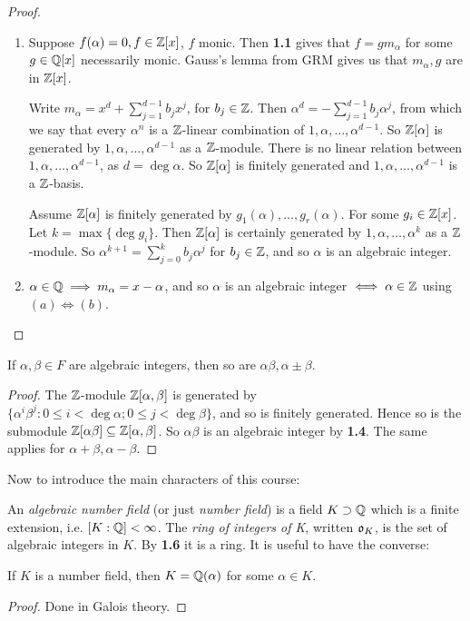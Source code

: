 \documentclass[10pt,a4paper]{article}
\begin{document}
\begin{proof}\item
\begin{enumerate}
\item
\begin{enumerate}
 Suppose $f(\alpha) = 0, f \in \mathbb{Z}[x]$, $f$ monic. Then \textbf{1.1} gives that $f = gm_{\alpha}$ for some $g \in \mathbb{Q}[x]$ necessarily monic. Gauss's lemma from GRM gives us that $m_{\alpha}, g$ are in $\mathbb{Z}[x]$.

 Write $m_{\alpha} = x^d + \sum_{j=1}^{d-1} b_j x^j$, for $b_j \in \mathbb{Z}$. Then $\alpha^d = -\sum_{j=1}^{d-1} b_j \alpha^j$, from which we say that every $\alpha^n$ is a $\mathbb{Z}$-linear combination of $1, \alpha, \ldots, \alpha^{d-1}$. So $\mathbb{Z}[\alpha]$ is generated by $1, \alpha, \ldots, \alpha^{d-1}$ as a $\mathbb{Z}$-module. There is no linear relation between $1, \alpha, \ldots, \alpha^{d-1}$, as $d = \deg \alpha$. So $\mathbb{Z}[\alpha]$ is finitely generated and $1, \alpha, \ldots, \alpha^{d-1}$ is a $\mathbb{Z}$-basis.

 Assume $\mathbb{Z}[\alpha]$ is finitely generated by $g_1(\alpha), \ldots, g_r(\alpha)$. For some $g_i \in \mathbb{Z}[x]$. Let $k = \max\{\deg g_i\}$. Then $\mathbb{Z}[\alpha]$ is certainly generated by $1, \alpha, \ldots, \alpha^k$ as a $\mathbb{Z}$-module. So $\alpha^{k+1} = \sum_{j=0}^k b_j \alpha^j$ for $b_j \in \mathbb{Z}$, and so $\alpha$ is an algebraic integer.
\end{enumerate}
\item $\alpha \in \mathbb{Q} \implies m_{\alpha} = x-\alpha$, and so $\alpha$ is an algebraic integer $\iff \alpha \in \mathbb{Z}$ using $(a) \iff (b)$.
\end{enumerate}
\end{proof}

\begin{theorem}
If $\alpha, \beta \in F$ are algebraic integers, then so are $\alpha\beta, \alpha\pm\beta$.
\end{theorem}
\begin{proof}
The $\mathbb{Z}$-module $\mathbb{Z}[\alpha,\beta]$ is generated by $\{\alpha^i\beta^j : 0 \leq i < \deg \alpha; 0 \leq j < \deg \beta\}$, and so is finitely generated. Hence so is the submodule $\mathbb{Z}[\alpha\beta]\subseteq \mathbb{Z}[\alpha,\beta]$. So $\alpha\beta$ is an algebraic integer by \textbf{1.4}. The same applies for $\alpha+\beta, \alpha-\beta$.
\end{proof}

Now to introduce the main characters of this course:

An \emph{algebraic number field} (or just \emph{number field}) is a field $K \supset \mathbb{Q}$ which is a finite extension, i.e. $[K:\mathbb{Q}] < \infty$. The \emph{ring of integers of K}, written $\mathfrak{o}_K$, is the set of algebraic integers in $K$. By \textbf{1.6} it is a ring. It is useful to have the converse:

\begin{theorem}
If $K$ is a number field, then $K = \mathbb{Q}(\alpha)$ for some $\alpha \in K$.
\end{theorem}
\begin{proof}
Done in Galois theory.
\end{proof}
\end{document}

